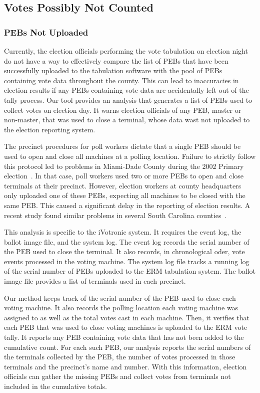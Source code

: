 \subsection{Votes Possibly Not Counted}
\subsubsection{PEBs Not Uploaded}
Currently, the election officials performing the vote tabulation on election night do not have a way to effectively compare the list of PEBs that have been successfully uploaded to the tabulation software with the pool of PEBs containing vote data throughout the county. This can lead to inaccuracies in election results if any PEBs containing vote data are accidentally left out of the tally process. Our tool provides an analysis that generates a list of PEBs used to collect votes on election day. It warns election officials of any PEB, master or non-master, that was used to close a terminal, whose data wast not uploaded to the election reporting system.   

The precinct procedures for poll workers dictate that a single PEB should be used to open and close all machines at a polling location. Failure to strictly follow this protocol led to problems in Miami-Dade County during the 2002 Primary election~\cite{Mazella2002}. In that case, poll workers used two or more PEBs to open and close terminals at their precinct.  However, election workers at county headquarters only uploaded one of these PEBs, expecting all machines to be closed with the same PEB. This caused a significant delay in the reporting of election results. A recent study found similar problems in several South Carolina counties~\cite{Buell2011}.

This analysis is specific to the iVotronic system. It requires the event log, the ballot image file, and the system log. The event log records the serial number of the PEB used to close the terminal.  It also records, in chronological oder, vote events processed in the voting machine. The system log file tracks a running log of the serial number of PEBs uploaded to the ERM tabulation system. The ballot image file provides a list of terminals used in each precinct.

Our method keeps track of the serial number of the PEB used to close each voting machine. It also records the polling location each voting machine was assigned to as well as the total votes cast in each machine. Then,  it verifies that each PEB that was used to close voting machines is uploaded to the ERM vote tally. It reports any PEB containing vote data that has not been added to the cumulative count.  For each such PEB, our analysis reports the serial numbers of the terminals collected by the PEB, the number of votes processed in those terminals and the precinct's name and number. With this information, election officials can gather the missing PEBs and collect votes from terminals not included in the cumulative totals.

